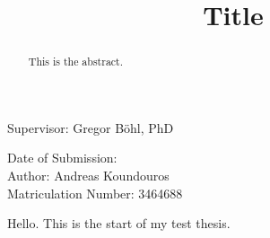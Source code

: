 \documentclass[12pt]{article}
\title{Title}
\author{}
\date{}
\numberwithin{equation}{section}
\begin{document}
\maketitle

\vspace{13cm}
\begin{center}
Supervisor: Gregor Böhl, PhD

\vspace{2cm}
Date of Submission: \\
Author: Andreas Koundouros\\
Matriculation Number: 3464688
\end{center}

\newpage
{} %
\begin{abstract}
This is the abstract.
\end{abstract}

\newpage
{} %
Hello. This is the start of my test thesis.
\end{document}
